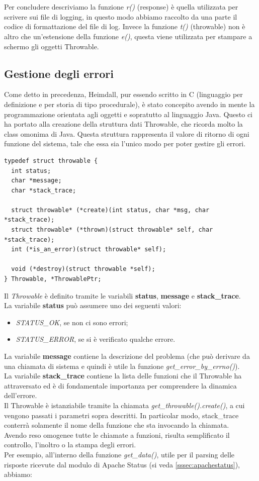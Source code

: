 \documentclass[italian]{tktltiki2}
\begin{document}
\\
\\
Per concludere descriviamo la funzione \emph{r()} (response) è quella utilizzata per scrivere sui file di logging, in questo modo abbiamo raccolto da una parte il codice di formattazione del file di log. Invece la funzione \emph{t()} (throwable) non è altro che un'estensione della funzione \emph{e()}, questa viene utilizzata per stampare a schermo gli oggetti Throwable.

\subsection{Gestione degli errori}
\label{sec:errors}
Come detto in precedenza, Heimdall, pur essendo scritto in C (linguaggio per definizione e per storia di tipo procedurale), è stato concepito avendo in mente la programmazione orientata agli oggetti e sopratutto al linguaggio Java. Questo ci ha portato alla creazione della struttura dati Throwable, che ricorda molto la class omonima di Java\cite{throwable_java}.
Questa struttura rappresenta il valore di ritorno di ogni funzione del sistema, tale che essa sia l'unico modo per poter gestire gli errori.
\begin{lstlisting}
typedef struct throwable {
  int status;
  char *message;
  char *stack_trace;

  struct throwable* (*create)(int status, char *msg, char *stack_trace);
  struct throwable* (*thrown)(struct throwable* self, char *stack_trace);
  int (*is_an_error)(struct throwable* self);
  
  void (*destroy)(struct throwable *self);
} Throwable, *ThrowablePtr;
\end{lstlisting} 
Il \emph{Throwable} è definito tramite le variabili \textbf{status}, \textbf{message} e \textbf{stack\_trace}.
\\
La variabile \textbf{status} può assumere uno dei seguenti valori:
\begin{itemize}
  \item \emph{STATUS\_OK}, se non ci sono errori;
  \item \emph{STATUS\_ERROR}, se si è verificato qualche errore.
\end{itemize}
La variabile \textbf{message} contiene la descrizione del problema (che può derivare da una chiamata di sistema e quindi è utile la funzione \emph{get\_error\_by\_errno()}).
\\
La variabile \textbf{stack\_trace} contiene la lista delle funzioni che il Throwable ha attraversato ed è di fondamentale importanza per comprendere la dinamica dell'errore.
\\
Il Throwable è istanziabile tramite la chiamata \emph{get\_throwable().create()}, a cui vengono passati i parametri sopra descritti. In particolar modo, stack\_trace conterrà solamente il nome della funzione che sta invocando la chiamata.
\\
Avendo reso omogenee tutte le chiamate a funzioni, risulta semplificato il controllo, l'inoltro o la stampa degli errori.
\\
Per esempio, all'interno della funzione \emph{get\_data()}, utile per il parsing delle risposte ricevute dal modulo di Apache Status (si veda \ref{sssec:apachestatus}), abbiamo:
\end{document}
